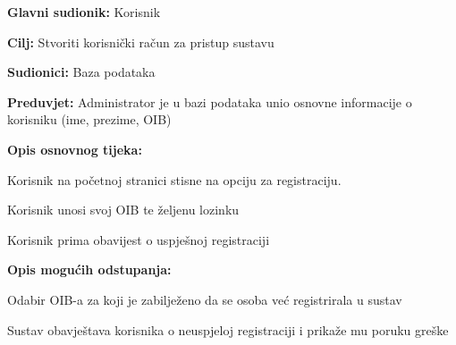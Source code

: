 					\noindent {}
					\begin{packed_item}
	
						\item \textbf{Glavni sudionik: }Korisnik
						\item  \textbf{Cilj:} Stvoriti korisnički račun za pristup sustavu
						\item  \textbf{Sudionici:} Baza podataka
						\item  \textbf{Preduvjet:} Administrator je u bazi podataka unio osnovne informacije o korisniku (ime, prezime, OIB)
						\item  \textbf{Opis osnovnog tijeka:}
						
						\item[] \begin{packed_enum}
	
							\item Korisnik na početnoj stranici stisne na opciju za registraciju.
							\item Korisnik unosi svoj OIB te željenu lozinku
							\item Korisnik prima obavijest o uspješnoj registraciji
						\end{packed_enum}
						
						\item  \textbf{Opis mogućih odstupanja:}
						
						\item[] \begin{packed_item}
	
							\item[2.a] Odabir OIB-a za koji je zabilježeno da se osoba već registrirala u sustav
							\item[] \begin{packed_enum}
								
								\item Sustav obavještava korisnika o neuspjeloj registraciji i prikaže mu poruku greške
								
								
							\end{packed_enum}
							
							
						\end{packed_item}
					\end{packed_item}
					
